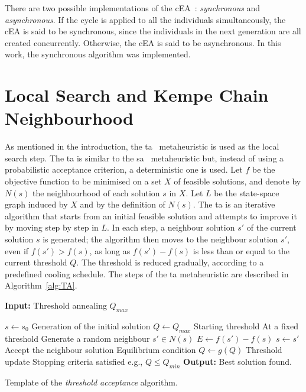 There are two possible implementations of the cEA~\citep{Alba2008}: \textit{synchronous} and \textit{asynchronous}. If the cycle is applied to all the individuals simultaneously, the cEA is said to be synchronous, since the individuals in the next generation are all created concurrently. Otherwise, the cEA is said to be asynchronous. In this work, the synchronous algorithm was implemented.




%
%
\section{Local Search and Kempe Chain Neighbourhood}
\label{sec:Chapter6_TA}

As mentioned in the introduction, the \gls{ta}~\citep{Dueck1990} metaheuristic is used as the local search step. The \gls{ta} is similar to the \gls{sa}~\citep{Kirkpatrick1983} metaheuristic
but, instead of using a probabilistic acceptance criterion, a deterministic one is used. Let $f$ be the objective function to be minimised on a set $X$ of feasible solutions, and denote by $N(s)$ the neighbourhood of each solution $s$ in $X$. Let $L$ be the state-space graph induced by $X$ and by the definition of $N(s)$. The \gls{ta} is an iterative algorithm that starts from an initial feasible solution and attempts to improve it by moving step by step in $L$. In each step, a neighbour solution $s'$ of the current solution $s$ is generated; the algorithm then moves to the neighbour solution $s'$, even if $f(s') > f(s)$, as long as $f(s') - f(s)$ is less than or equal to the current threshold $Q$. The threshold is reduced gradually, according to a predefined cooling schedule. The steps of the \gls{ta} metaheuristic are described in Algorithm~\ref{alg:TA}.

\begin{algorithm}[!ht]
	\textbf{Input:} Threshold annealing $Q_{max}$
	\begin{algorithmic}[1]
		\State $s \leftarrow s_0$ \Comment Generation of the initial solution
		\State  $Q \leftarrow Q_{max}$ \Comment Starting threshold
		\Repeat
		\Repeat \Comment At a fixed threshold
		\State Generate a random neighbour $s' \in N(s)$
		\State $E \leftarrow f(s') - f(s)$ \label{alglineTA:acceptanceRuleBegin}
		 {$s \leftarrow s'$} \EndIf \label{alglineTA:acceptanceRuleEnd} \Comment Accept the neighbour solution 
		\Until Equilibrium condition 			
		\State $Q \leftarrow g(Q)$ \Comment Threshold update
		\Until Stopping criteria satisfied \Comment e.g., $Q \leq Q_{min}$
		\State \textbf{Output:} Best solution found.
	\end{algorithmic}
	\caption{Template of the \textit{threshold acceptance} algorithm.}
	\label{alg:TA}
\end{algorithm}



